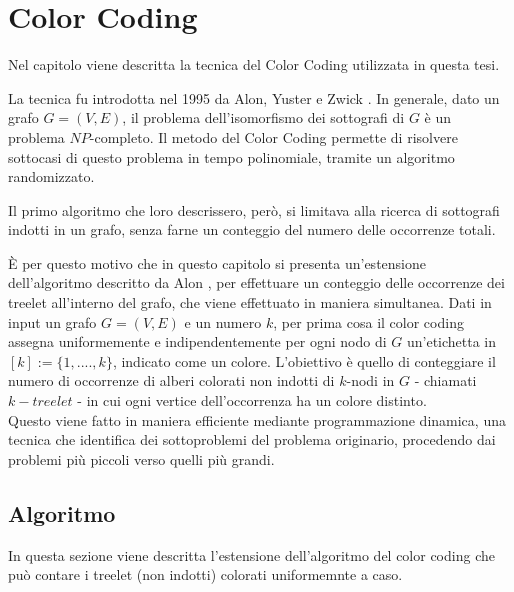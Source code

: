 \chapter{Color Coding}

Nel capitolo viene descritta la tecnica del Color Coding utilizzata in questa tesi.

La tecnica fu introdotta nel 1995 da Alon, Yuster e Zwick \cite{alon1995color}.
In generale, dato un grafo $G = (V,E)$, il problema dell'isomorfismo dei sottografi  di $G$ \`e un problema $NP$-completo.
Il metodo del Color Coding permette di risolvere sottocasi di questo problema in tempo polinomiale, tramite un algoritmo randomizzato.

Il primo algoritmo che loro descrissero, per\`o, si limitava alla ricerca di sottografi indotti in un grafo, senza farne un conteggio del numero delle occorrenze totali.
 
\`E per questo motivo che in questo capitolo si presenta un'estensione dell'algoritmo descritto da Alon \cite{alon1995color,bressan2018motif}, per effettuare un conteggio delle occorrenze dei treelet all'interno del grafo, che viene effettuato in maniera simultanea.
Dati in input un grafo $ G=(V,E) $ e un numero $ k $, per prima cosa il color coding assegna uniformemente e indipendentemente per ogni nodo di $ G $ un'etichetta in $ [k] := \{1,....,k\} $, indicato come un colore.
L'obiettivo \`e quello di conteggiare il numero di occorrenze di alberi colorati non indotti di $ k$-nodi in $ G $ - chiamati $ k-treelet $ - in cui ogni vertice dell'occorrenza ha un colore distinto.\\
Questo viene fatto in maniera efficiente mediante  programmazione dinamica, una tecnica che identifica dei sottoproblemi del problema originario, procedendo dai problemi pi\`u piccoli verso quelli pi\`u grandi.




\section{Algoritmo}
\label{section1}

In questa sezione viene descritta l'estensione dell'algoritmo del color coding che pu\`o contare i treelet (non indotti) colorati uniformemnte a caso.

